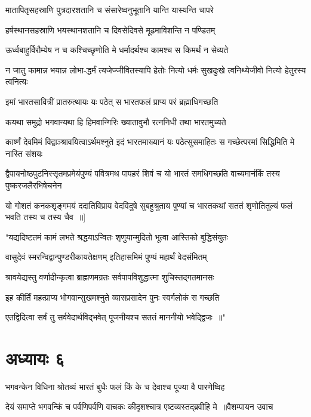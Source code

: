 \twolineshloka
{मातापितृसहस्राणि पुत्रदारशतानि च}
{संसारेष्वनुभूतानि यान्ति यास्यन्ति चापरे}


\twolineshloka
{हर्षस्थानसहस्राणि भयस्थानशतानि च}
{दिवसेदिवसे मूढमाविशन्ति न पण्डितम्}


\twolineshloka
{ऊर्ध्वबाहुर्विरौम्येष न च कश्चिच्छृणोति मे}
{धर्मादर्थश्च कामश्च स किमर्थं न सेव्यते}


\twolineshloka
{न जातु कामान्न भयान्न लोभा-द्धर्मं त्यजेज्जीवितस्यापि हेतोः}
{नित्यो धर्मः सुखदुःखे त्वनिथ्येजीवो नित्यो हेतुरस्य त्वनित्यः}


\twolineshloka
{इमां भारतसावित्रीं प्रातरुत्थायः यः पठेत्}
{स भारतफलं प्राप्य परं ब्रह्माधिगच्छति}


\twolineshloka
{कयथा समुद्रो भगवान्यथा हि हिमवान्गिरिः}
{ख्यातावुभौ रत्ननिधी तथा भारतमुच्यते}


\threelineshloka
{कार्ष्णं देवमिमं विद्वाञ्श्रावयित्वाऽर्थमश्नुते}
{इदं भारतमाख्यानं यः पठेत्सुसमाहितः}
{स गच्छेत्परमां सिद्धिमिति मे नास्ति संशयः}


\twolineshloka
{द्वैपायनोष्ठपुटनिस्सृतमप्रमेयंपुण्यं पवित्रमथ पापहरं शिवं च}
{यो भारतं समधिगच्छति वाच्यमानंकिं तस्य पुष्करजलैरभिषेचनेन}


\twolineshloka
{यो गोशतं कनकशृङ्गमयं ददातिविप्राय वेदविदुषे सुबहुश्रुताय}
{पुण्यां च भारतकथां सततं शृणोतितुल्यं फलं भवति तस्य च तस्य चैव ॥]}


\twolineshloka
{"यद्यदिष्टतमं कामं लभते श्रद्धयाऽन्वितः}
{शृणुयान्मुदितो भूत्वा आस्तिको बुद्धिसंयुतः}


\twolineshloka
{वासुदेवं स्मरन्विद्वान्पुण्डरीकायतेक्षणम्}
{इतिहासमिमं पुण्यं महार्थं वेदसंमितम्}


\twolineshloka
{श्रावयेद्यस्तु वर्णादीन्कृत्वा ब्राह्मणमग्रतः}
{सर्वपापविशुद्धात्मा शुचिस्तद्गतमानसः}


\twolineshloka
{इह कीर्तिं महत्प्राप्य भोगवान्सुखमश्नुते}
{व्यासप्रसादेन पुनः स्वर्गलोकं स गच्छति}


\twolineshloka
{एतद्विदित्वा सर्वं तु सर्ववेदार्थविद्भवेत्}
{पूजनीयश्च सततं माननीयो भवेद्द्विजः ॥"}


\chapter{अध्यायः ६}
\twolineshloka
{भगवन्केन विधिना श्रोतव्यं भारतं बुधैः}
{फलं किं के च देवाश्च पूज्या वै पारणेष्विह}


\threelineshloka
{देयं समाप्ते भगवन्किं च पर्वणिपर्वणि}
{वाचकः कीदृशश्चात्र एष्टव्यस्तद्ब्रवीहि मे ॥वैशम्पायन उवाच}
{}


